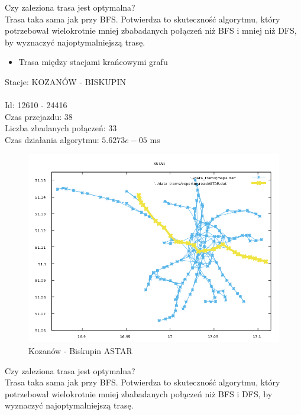 \documentclass[13pt]{article}
\begin{document}
Czy zaleziona trasa jest optymalna?\\
Trasa taka sama jak przy BFS. Potwierdza to skuteczność algorytmu, który potrzebował wielokrotnie mniej zbabadanych połączeń niż BFS i mniej niż DFS, by wyznaczyć najoptymalniejszą trasę.

\newpage
\begin{itemize}
\item Trasa między stacjami krańcowymi grafu
\end{itemize}
\hspace{1.5cm}Stacje: KOZANÓW - BISKUPIN\\\\
Id: 12610   - 24416\\
Czas przejazdu: 38\\
Liczba zbadanych połączeń: 33\\
Czas działania algorytmu: $5.6273e-05$ ms\\
\begin{figure}[hp]
\centering
\includegraphics[width=1\textwidth]{wykresy/KOZA_BIS_ASTAR.png}
\caption{Kozanów - Biskupin ASTAR}
\end{figure}

Czy zaleziona trasa jest optymalna?\\
Trasa taka sama jak przy BFS. Potwierdza to skuteczność algorytmu, który potrzebował wielokrotnie mniej zbabadanych połączeń niż BFS i DFS, by wyznaczyć najoptymalniejszą trasę.
\end{document}
